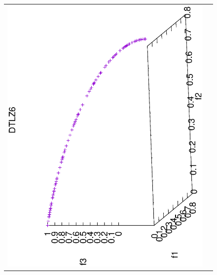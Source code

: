 \begin{figure}[H]
\begin{tabular}{cc}
 \includegraphics[scale=0.3, angle=-90,origin=c]{Figures_Chapter7/Results_Chapter4/Summary_Representative/VSD-MOEA-D/DTLZ6.eps} \\

\end{tabular}
\end{figure}
